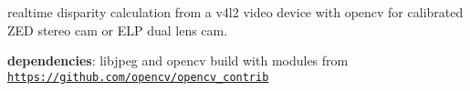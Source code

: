 realtime disparity calculation from a v4l2 video device with opencv for calibrated Z\+ED stereo cam or E\+LP dual lens cam.

{\bfseries dependencies}\+: libjpeg and opencv build with modules from \href{https://github.com/opencv/opencv_contrib}{\tt https\+://github.\+com/opencv/opencv\+\_\+contrib} 